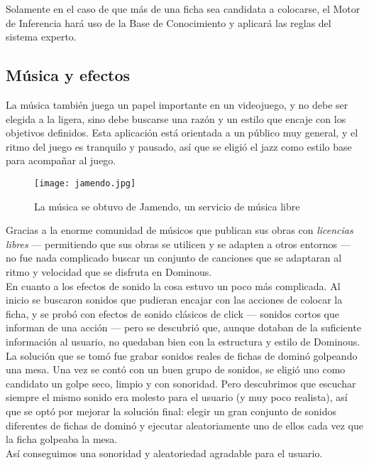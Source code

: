Solamente en el caso de que más de una ficha sea candidata a colocarse, el Motor de Inferencia hará uso de la Base
de Conocimiento y aplicará las reglas del sistema experto.

\subsection{Música y efectos}


La música también juega un papel importante en un videojuego, y no debe ser elegida a la ligera, sino
        debe buscarse una razón y un estilo que encaje con los objetivos definidos. Esta aplicación está orientada a un
        público muy general, y el ritmo del juego es tranquilo y pausado, así que se eligió el jazz como estilo base
        para acompañar al juego.

\begin{figure}[h]
  \label{jamendo}
  \begin{center}
    \texttt{[image: jamendo.jpg]}
  \end{center}
  \caption{La música se obtuvo de Jamendo, un servicio de música libre}
\end{figure}

        Gracias a la enorme comunidad de músicos que publican sus obras con \emph{licencias libres}
        --- permitiendo que sus obras se utilicen y se adapten a otros entornos --- no fue nada complicado buscar
        un conjunto de canciones que se adaptaran al ritmo y velocidad que se disfruta en Dominous. \\

        En cuanto a los efectos de sonido la cosa estuvo un poco más complicada. Al inicio se buscaron sonidos que
        pudieran encajar con las acciones de colocar la ficha, y se probó con efectos de sonido clásicos de click --- sonidos
        cortos que informan de una acción --- pero se descubrió que, aunque dotaban de la suficiente información
        al usuario, no quedaban bien con la estructura y estilo de Dominous. \\

        La solución que se tomó fue grabar sonidos reales de fichas de dominó golpeando una mesa. Una vez se contó con
        un buen grupo de sonidos, se eligió uno como candidato un golpe seco, limpio y con sonoridad. Pero descubrimos
        que escuchar siempre el mismo sonido era molesto para el usuario (y muy poco realista), así que se optó por mejorar
        la solución final: elegir un gran conjunto de sonidos diferentes de fichas de dominó y ejecutar aleatoriamente
        uno de ellos cada vez que la ficha golpeaba la mesa. \\
        
        Así conseguimos una sonoridad y aleatoriedad agradable para el usuario.
